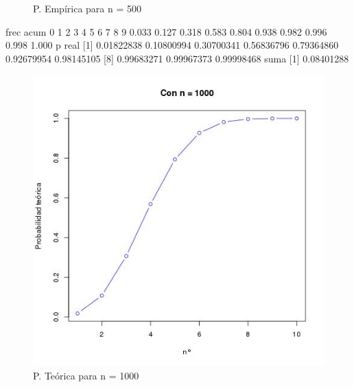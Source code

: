 \documentclass[letter,10pt]{article}
\begin{document}
\begin{itemize}
\begin{minipage}{\linewidth}
\begin{minipage}{0.45\linewidth}
\begin{figure}[H]
              \caption{P. Emp\'irica para n = 500}
          \end{figure}
      \end{minipage}
  \end{minipage}
  
 frec acum
    0     1     2     3     4     5     6     7     8     9 
0.033 0.127 0.318 0.583 0.804 0.938 0.982 0.996 0.998 1.000 
 p real
 [1] 0.01822838 0.10800994 0.30700341 0.56836796 0.79364860 0.92679954 0.98145105
 [8] 0.99683271 0.99967373 0.99998468
 suma
[1] 0.08401288

  \begin{minipage}{\linewidth}
      \centering
      \begin{minipage}{0.45\linewidth}
          \begin{figure}[H]
              \includegraphics[width=\linewidth]{p4_teo_1000.jpg}
              \caption{P. Te\'orica para n = 1000}
          \end{figure}
      \end{minipage}
      \hspace{0.05\linewidth}
      \begin{minipage}{0.45\linewidth}
          \begin{figure}[H]

\end{figure}
\end{minipage}
\end{minipage}
\end{itemize}
\end{document}
